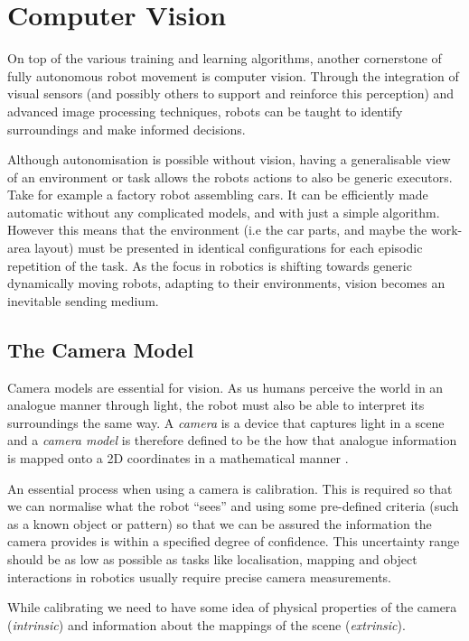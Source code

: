 \section{Computer Vision}
On top of the various training and learning algorithms, another cornerstone of fully autonomous robot movement is computer vision. Through the integration of visual sensors (and possibly others to support and reinforce this perception) and advanced image processing techniques, robots can be taught to identify surroundings and make informed decisions. 

Although autonomisation is possible without vision, having a generalisable view of an environment or task allows the robots actions to also be generic executors. Take for example a factory robot assembling cars. It can be efficiently made automatic without any complicated models, and with just a simple algorithm. However this means that the environment (i.e the car parts, and maybe the work-area layout) must be presented in identical configurations for each episodic repetition of the task.
As the focus in robotics is shifting towards generic dynamically moving robots, adapting to their environments, vision becomes an inevitable sending medium.

\subsection{The Camera Model}
Camera models are essential for vision. As us humans perceive the world in an analogue manner through light, the robot must also be able to interpret its surroundings the same way. A \emph{camera} is a device that captures light in a scene and a \emph{camera model} is therefore defined to be the how that analogue information is mapped onto a 2D coordinates in a mathematical manner \cite{zhang2021cameramodels}. 

An essential process when using a camera is calibration. This is required so that we can normalise what the robot ``sees'' and using some pre-defined criteria (such as a known object or pattern) so that we can be assured the information the camera provides is within a specified degree of confidence. This uncertainty range should be as low as possible as tasks like localisation, mapping and object interactions in robotics usually require precise camera measurements.

While calibrating we need to have some idea of physical properties of the camera (\emph{intrinsic}) and information about the mappings of the scene (\emph{extrinsic}).

